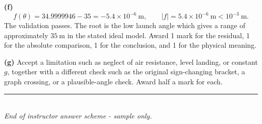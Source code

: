 \documentclass[11pt,a4paper]{article}
\begin{document}
\textbf{(f)}
\[
  f(\theta)=34.9999946-35=-5.4\times10^{-6}\ \mathrm{m},
  \qquad |f|=5.4\times10^{-6}\ \mathrm{m}<10^{-3}\ \mathrm{m}.
\]
The validation passes. The root is the low launch angle which gives a range of approximately \(35\ \mathrm{m}\) in the stated ideal model. Award 1 mark for the residual, 1 for the absolute comparison, 1 for the conclusion, and 1 for the physical meaning.

\textbf{(g)} Accept a limitation such as neglect of air resistance, level landing, or constant \(g\), together with a different check such as the original sign-changing bracket, a graph crossing, or a plausible-angle check. Award half a mark for each.

\vfill
\begin{center}
  \color{teal}\rule{0.75\textwidth}{0.5pt}\\[3pt]
  \small\textit{End of instructor answer scheme - sample only.}
\end{center}
\end{document}
